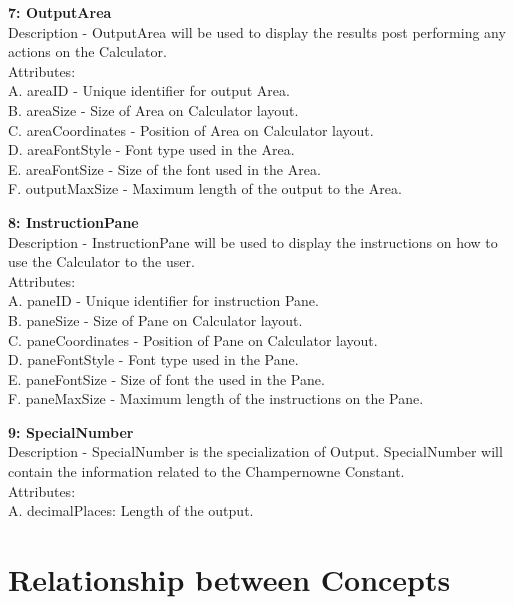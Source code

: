 \documentclass[paper=a4, fontsize=11pt]{report}
\numberwithin{equation}{section}		%
\numberwithin{figure}{section}			%
\numberwithin{table}{section}				%
\begin{document}
\begin{flushleft}
\textbf{7: OutputArea}
\\Description - OutputArea will be used to display the results post performing any actions on the Calculator.
\\Attributes:
\\A. areaID - Unique identifier for output Area.
\\B. areaSize - Size of Area on Calculator layout.
\\C. areaCoordinates - Position of Area on Calculator layout.
\\D. areaFontStyle - Font type used in the Area.
\\E. areaFontSize - Size of the font used in the Area.
\\F. outputMaxSize - Maximum length of the output to the Area.
\end{flushleft}

\begin{flushleft}
\textbf{8: InstructionPane   }
\\Description - InstructionPane will be used to display the instructions on how to use the Calculator to the user.
\\Attributes:
\\A. paneID - Unique identifier for instruction Pane.
\\B. paneSize - Size of Pane on Calculator layout.
\\C. paneCoordinates - Position of Pane on Calculator layout.
\\D. paneFontStyle - Font type used in the Pane.
\\E. paneFontSize - Size of font the used in the Pane.
\\F. paneMaxSize - Maximum length of the instructions on the Pane.

\end{flushleft}

\begin{flushleft}
\textbf{9: SpecialNumber   }
\\Description - SpecialNumber is the specialization of Output. SpecialNumber will contain the information related to the Champernowne Constant.
\\Attributes:
\\A. decimalPlaces: Length of the output.
\end{flushleft}

\section{Relationship between Concepts  }
\end{document}
